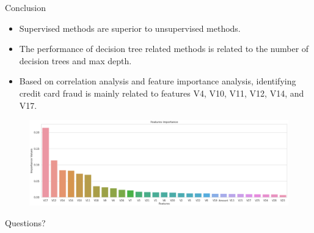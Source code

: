 \documentclass[
 size=14pt,
 paper=smartboard,  %
 mode=present, 		%
 display=slides, 	%
 style=tuliplab,  	%
 pauseslide,
 fleqn,leqno]{powerdot}
\begin{document}
\begin{slide}[toc=,bm=]{Conclusion}
\begin{itemize}
\item
\smallskip
Supervised methods are superior to unsupervised methods.

\item
\smallskip
The performance of decision tree related methods is related to the number of decision trees and max depth.

\item
\smallskip
Based on correlation analysis and feature importance analysis, identifying credit card fraud is mainly related to features V4, V10, V11, V12, V14, and V17.

\end{itemize}
	\begin{figure}
	\centering
	\includegraphics[scale=0.455]{fi.eps}
\end{figure}

\end{slide}


%
\begin{slide}[toc=,bm=]{Questions?}
\begin{center}
\begin{figure}
\end{figure}
\end{center}
\end{slide}
\end{document}

